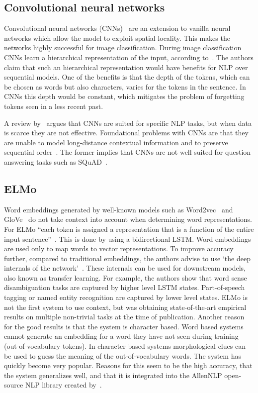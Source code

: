 \subsection{Convolutional neural networks}
\label{subsec:cnn}
Convolutional neural networks (CNNs)~\citep{lecun1995convolutional} are an extension to vanilla neural networks which allow the model to exploit spatial locality.
This makes the networks highly successful for image classification.
During image classification CNNs learn a hierarchical representation of the input, according to~\citet{conneau2016very}.
The authors claim that such an hierarchical representation would have benefits for NLP over sequential models.
One of the benefits is that the depth of the tokens, which can be chosen as words but also characters, varies for the tokens in the sentence.
In CNNs this depth would be constant, which mitigates the problem of forgetting tokens seen in a less recent past.

A review by~\citet{young2018recent} argues that CNNs are suited for specific NLP tasks, but when data is scarce they are not effective.
Foundational problems with CNNs are that they are unable to model long-distance contextual information and to preserve sequential order~\citep{young2018recent}.
The former implies that CNNs are not well suited for question answering tasks such as SQuAD~\citep{rajpurkar2018}.

\subsection{ELMo}
\label{subsec:elmo}
Word embeddings generated by well-known models such as Word2vec~\citep{mikolov2013distributed} and GloVe~\citep{pennington2014} do not take context into account when determining word representations.
For ELMo ``each token is assigned a representation that is a function of the entire input sentence''~\citep{peters2018}.
This is done by using a bidirectional LSTM.
Word embeddings are used only to map words to vector representations.
To improve accuracy further, compared to traditional embeddings, the authors advise to use `the deep internals of the network'~\citep{peters2018}.
These internals can be used for downstream models, also known as transfer learning.
For example, the authors show that word sense disambiguation tasks are captured by higher level LSTM states.
Part-of-speech tagging or named entity recognition are captured by lower level states.
ELMo is not the first system to use context, but was obtaining state-of-the-art empirical results on multiple non-trivial tasks at the time of publication.
Another reason for the good results is that the system is character based.
Word based systems cannot generate an embedding for a word they have not seen during training (out-of-vocabulary tokens).
In character based systems morphological clues can be used to guess the meaning of the out-of-vocabulary words.
The system has quickly become very popular.
Reasons for this seem to be the high accuracy, that the system generalizes well, and that it is integrated into the AllenNLP open-source NLP library created by~\citet{gardner2017}.

